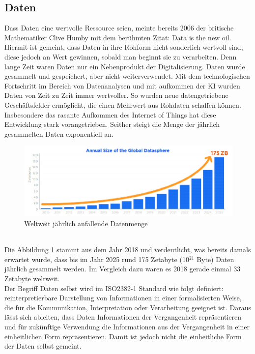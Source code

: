 \begin{onehalfspace}
    \subsection{Daten}
    \label{subsubsec:daten}
    Dass Daten eine wertvolle Ressource seien, meinte bereits 2006 der britische Mathematiker Clive Humby mit dem berühmten Zitat: \glqq{}Data is the new oil\grqq{}.\cite{Frorbes2021} Hiermit ist gemeint, dass Daten in ihre Rohform nicht sonderlich wertvoll sind, diese jedoch an Wert gewinnen, sobald man beginnt sie zu verarbeiten. Denn lange Zeit waren Daten nur ein Nebenprodukt der Digitalisierung. Daten wurde gesammelt und gespeichert, aber nicht weiterverwendet. Mit dem technologischen Fortschritt im Bereich von Datenanalysen und mit aufkommen der \ac{KI} wurden Daten von Zeit zu Zeit immer wertvoller. So wurden neue datengetriebene Geschäftsfelder ermöglicht, die einen Mehrwert aus Rohdaten schaffen können. Insbesondere das rasante Aufkommen des Internet of Things hat diese Entwicklung stark vorangetrieben. Seither steigt die Menge der jährlich gesammelten Daten exponentiell an.\cite{Otto2019}
        \\
        \begin{figure}[h]
            \centering
            \includegraphics[width = 15.5cm]{Bilder/Annual_Data_Size.png}
            \caption{Weltweit jährlich anfallende Datenmenge \cite{Reinsel2018}}
            \label{fig:DataSize}
        \end{figure}
        \\
        Die Abbildung \ref{fig:DataSize} stammt aus dem Jahr 2018 und verdeutlicht, was bereits damals erwartet wurde, dass bis im Jahr 2025 rund 175 Zetabyte (10$^{21}$ Byte) Daten jährlich gesammelt werden. Im Vergleich dazu waren es 2018 gerade einmal 33 Zetabyte weltweit.\cite{Reinsel2018}\cite{Taleb2018}
        \\
        Der Begriff Daten selbst wird im ISO2382-1 Standard wie folgt definiert: \glqq{}reinterpretierbare Darstellung von Informationen in einer formalisierten Weise, die für die Kommunikation, Interpretation oder Verarbeitung geeignet ist\grqq{}.\cite{ISO2382} Daraus lässt sich ableiten, dass Daten Informationen der Vergangenheit repräsentieren und für zukünftige Verwendung die Informationen aus der Vergangenheit in einer einheitlichen Form repräsentieren. Damit ist jedoch nicht die einheitliche Form der Daten selbst gemeint. 

\end{onehalfspace}
